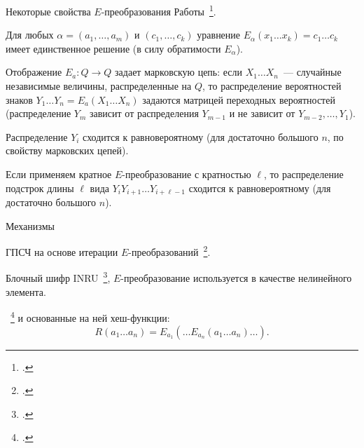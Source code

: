 \begin{frame}{Некоторые свойства $E$-преобразования}
    Работы~\footcite{markovski1999quasigroup, bakeva2011some, markovski2017quasigroup}.
    \begin{coloritemize}
        \item Для любых $\alpha = (a_1, \ldots, a_m)$ и $(c_1, \ldots, c_k)$ уравнение 
        \(
            E_{\alpha}(x_1 \ldots x_k) = c_1 \ldots c_k
        \)
        имеет единственное решение (в силу обратимости $E_{\alpha}$).
        \pause 
        \item Отображение $E_a \colon Q \to Q$ задает марковскую цепь: если $X_1 \ldots X_n$~--- случайные независимые величины, распределенные на $Q$, то распределение вероятностей знаков $Y_1 \ldots Y_n = E_a(X_1 \ldots X_n)$ задаются матрицей переходных вероятностей (распределение $Y_m$ зависит от распределения $Y_{m-1}$ и не зависит от $Y_{m-2}, \ldots, Y_1$).
        \pause 
        \item Распределение $Y_i$ сходится к равновероятному (для достаточно большого $n$, по свойству марковских цепей).
        \pause 
        \item Если применяем кратное $E$-преобразование с кратностью $\ell$, то распределение подстрок длины $\ell$ вида $Y_i Y_{i+1} \ldots Y_{i + \ell - 1}$ сходится к равновероятному (для достаточно большого $n$).
    \end{coloritemize}
\end{frame}


\begin{frame}{Механизмы}
    \begin{coloritemize}
        \item ГПСЧ на основе итерации $E$-преобразований~\footcite{dimitrova2004quasigroup, markovski2005unbiased}.
        \item Блочный шифр INRU~\footcite{inru}, $E$-преобразование используется в качестве нелинейного элемента.
        \item  {}~\footcite{gligoroski2008edon, gligoroski2009family, EdonR, EdonRprime} и основанные на ней хеш-функции:
        \begin{equation*}
            R(a_1 \ldots a_n) = E_{a_1} \left( \ldots E_{a_n}(a_1 \ldots a_n) \ldots \right).
        \end{equation*}
    \end{coloritemize}
\end{frame}


